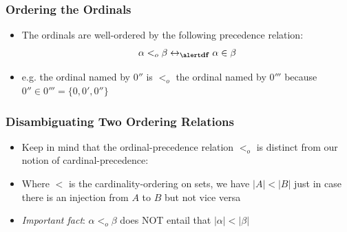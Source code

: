\begin{frame}
\begin{columns}
\begin{column}{.6\textwidth}
\begin{itemize}[<+->]
      \end{itemize}
    \end{column}
  \end{columns}
\end{frame}

\begin{frame}
\frametitle{Ordering the Ordinals}

\begin{itemize}[<+->]

\item The ordinals are well-ordered by the following precedence relation:
$$\alpha <_o \beta \leftrightarrow_{\text{\emph{df}}} \alpha \in \beta$$

\item e.g. the ordinal named by $0''$ is $<_o$ the ordinal named by $0'''$ because $0'' \in 0''' = \{0, 0', 0'' \}$

\end{itemize}
\end{frame}

\begin{frame}
\frametitle{Disambiguating Two Ordering Relations}

\begin{itemize}[<+->]

\item Keep in mind that the ordinal-precedence relation $<_o$ is distinct from our notion of cardinal-precedence:

\item Where $<$ is the cardinality-ordering on sets, we have $|A| < |B|$ just in case there is an injection from $A$ to $B$ but not vice versa

\item \emph{Important fact}: $\alpha <_o \beta$ does NOT entail that $|\alpha| < |\beta|$



\end{itemize}
\end{frame}

